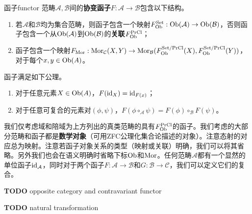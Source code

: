 \documentclass[../main.tex]{subfiles}
\begin{document}
\begin{definition}{函子}{functor}
范畴$\mathcal{A},\mathcal{B}$间的\textbf{协变函子}$F:\mathcal{A}\to\mathcal{B}$包含以下结构。
\begin{enumerate}
    \item 若$\mathcal{A}$和$\mathcal{B}$均为集合范畴，则函子包含一个映射$F_{\operatorname{Ob}}^{\text{Set}}:\operatorname{Ob}(\mathcal{A})\to\operatorname{Ob}(\mathcal{B})$，否则函子包含一个从$\operatorname{Ob}(\mathcal{A})$到$\operatorname{Ob}(\mathcal{B})$的\textbf{关联}$F_{\operatorname{Ob}}^{\text{PrCl}}$；
    \item 函子包含一个映射$F_{\operatorname{Mor}}:\operatorname{Mor}_\mathcal{C}(X,Y)\to\operatorname{Mor}_\mathcal{B}(F_{\operatorname{Ob}}^{\text{Set/PrCl}}(X),F_{\operatorname{Ob}}^{\text{Set/PrCl}}(Y))$，对于每个$x,y\in\operatorname{Ob}(A)$。
\end{enumerate}
函子满足如下公理。
\begin{enumerate}
    \item 对于任意元素$X\in\operatorname{Ob}(A)$，$F(\operatorname{id}_X)=\operatorname{id}_{F(x)}$；
    \item 对于任意可复合的元素对$(\phi,\psi)$，$F(\phi\circ_\mathcal{A}\psi)=F(\phi)\circ_\mathcal{B}F(\psi)$。
\end{enumerate}
\end{definition}
我们仅考虑域和陪域为上方列出的真类范畴的具有$F_{\operatorname{Ob}}^{\text{PrCl}}$的函子。我们考虑的大部分范畴和函子都是\textbf{数学对象}（可用ZFC公理化集合论描述的对象）。注意态射的对应总为映射。注意若函子对象关系的类型（映射或关联）明确，我们可以将其省略。另外我们也会在语义明确时省略下标$\operatorname{Ob}$和$\operatorname{Mor}$。任何范畴$\mathcal{A}$都有一个显然的单位函子$\operatorname{id}_\mathcal{A}$，同时对于两个函子$F:\mathcal{A}\to\mathcal{B}$和$G:\mathcal{B}\to\mathcal{C}$，我们可以定义它们的复合。

\textbf{TODO} opposite category and contravariant functor

\textbf{TODO} natural transformation
\end{document}
